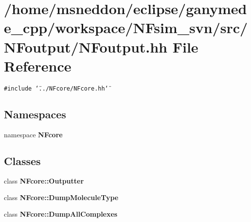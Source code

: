 \section{/home/msneddon/eclipse/ganymede\_\-cpp/workspace/NFsim\_\-svn/src/NFoutput/NFoutput.hh File Reference}
\label{NFoutput_8hh}


{\tt \#include \char`\"{}../NFcore/NFcore.hh\char`\"{}}\par
\subsection*{Namespaces}
\begin{CompactItemize}
\item 
namespace {\bf NFcore}
\end{CompactItemize}
\subsection*{Classes}
\begin{CompactItemize}
\item 
class {\bf NFcore::Outputter}
\item 
class {\bf NFcore::DumpMoleculeType}
\item 
class {\bf NFcore::DumpAllComplexes}
\end{CompactItemize}
